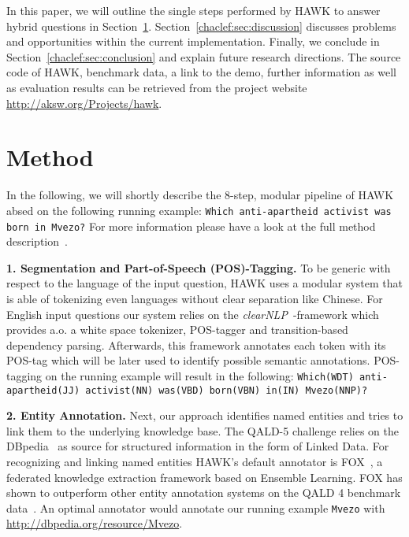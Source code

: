 In this paper, we will outline the single steps performed by HAWK to answer hybrid questions in Section~\ref{chaclef:sec:method}.
Section~\ref{chaclef:sec:discussion} discusses problems and opportunities within the current implementation.
Finally, we conclude in Section~\ref{chaclef:sec:conclusion} and explain future research directions.
The source code of HAWK, benchmark data, a link to the demo, further information as well as evaluation results can be retrieved from the project website \url{http://aksw.org/Projects/hawk}.


\section{Method}
\label{chaclef:sec:method}

In the following, we will shortly describe the 8-step, modular pipeline of HAWK absed on the following running example: \texttt{Which anti-apartheid activist was born in Mvezo?}
For more information please have a look at the full method description~\cite{HAWK_2015}.


\textbf{1. Segmentation and Part-of-Speech (POS)-Tagging.} 
To be generic with respect to the language of the input question, HAWK uses a modular system that is able of tokenizing even languages without clear separation like Chinese.
For English input questions our system relies on the \emph{clearNLP}~\cite{choi2011getting}-framework which provides a.o. a white space tokenizer, POS-tagger and transition-based dependency parsing.
Afterwards, this framework annotates each token with its POS-tag which will be later used to identify possible semantic annotations. 
POS-tagging on the running example will result in the following: \texttt{Which(WDT) anti-apartheid(JJ) activist(NN) was(VBD) born(VBN) in(IN) Mvezo(NNP)?}

\textbf{2. Entity Annotation.} 
Next, our approach identifies named entities and tries to link them to the underlying knowledge base. 
The QALD-5 challenge relies on the DBpedia~\cite{jl_2014/swj_dbpedia} as source for structured information in the form of Linked Data. 
For recognizing and linking named entities HAWK's default annotator is FOX~\cite{FOX}, a federated knowledge extraction framework based on Ensemble Learning. 
FOX has shown to outperform other entity annotation systems on the QALD 4 benchmark data~\cite{HAWK_2015}.
An optimal annotator would annotate our running example \texttt{Mvezo} with \url{http://dbpedia.org/resource/Mvezo}.

